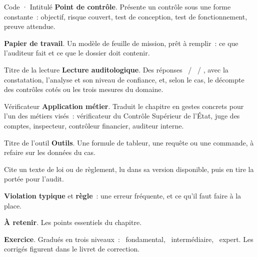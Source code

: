 \begin{boxobjet}{Code · Intitulé}
\textbf{Point de contrôle}. Présente un contrôle sous une forme
constante~: objectif, risque couvert, test de conception, test de
fonctionnement, preuve attendue.
\end{boxobjet}

\begin{boxprocedure}
\textbf{Papier de travail}. Un modèle de feuille de mission, prêt à
remplir~: ce que l'auditeur fait et ce que le dossier doit contenir.
\end{boxprocedure}

\begin{boxlecture}{Titre de la lecture}
\textbf{Lecture auditologique}. Des réponses \OUI{}~/ \NON{}~/ \NEK{},
avec la constatation, l'analyse et son niveau de confiance, et, selon le
cas, le décompte des contrôles cotés ou les trois mesures du domaine.

\medskip
\hfill{}\quad{}
\end{boxlecture}

\begin{boxmetier}{Vérificateur}
\textbf{Application métier}. Traduit le chapitre en gestes concrets pour
l'un des métiers visés~: vérificateur du Contrôle Supérieur de l'État,
juge des comptes, inspecteur, contrôleur financier, auditeur interne.
\end{boxmetier}

\begin{boxoutils}{Titre de l'outil}
\textbf{Outils}. Une formule de tableur, une requête ou une commande, à
refaire sur les données du cas.
\end{boxoutils}

\begin{boxjuris}
Cite un texte de loi ou de règlement, lu dans sa version disponible, puis
en tire la portée pour l'audit.
\end{boxjuris}

\begin{boxalert}
\textbf{Violation typique} et \textbf{règle}~: une erreur fréquente, et ce
qu'il faut faire à la place.
\end{boxalert}

\begin{boxresume}
\textbf{À retenir}. Les points essentiels du chapitre.
\end{boxresume}

\begin{boxexo}
\textbf{Exercice}. Gradués en trois niveaux~: \niveaubase\ fondamental,
\niveaumoyen\ intermédiaire, \niveauexpert\ expert. Les corrigés figurent
dans le livret de correction.
\end{boxexo}

